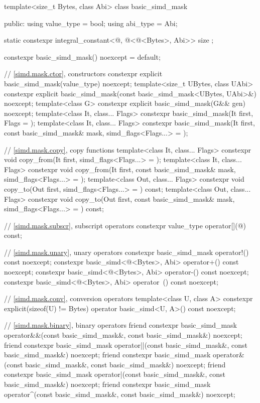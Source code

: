 \begin{codeblock}
template<size_t Bytes, class Abi> class basic_simd_mask {
public:
  using value_type = bool;
  using abi_type = Abi;

  static constexpr integral_constant<@\simdsizetype@, @\simdsizev@<@\integerfrom@<Bytes>, Abi>>
    size {};

  constexpr basic_simd_mask() noexcept = default;

  // \ref{simd.mask.ctor},  constructors
  constexpr explicit basic_simd_mask(value_type) noexcept;
  template<size_t UBytes, class UAbi>
    constexpr explicit basic_simd_mask(const basic_simd_mask<UBytes, UAbi>&) noexcept;
  template<class G> constexpr explicit basic_simd_mask(G&& gen) noexcept;
  template<class It, class... Flags>
    constexpr basic_simd_mask(It first, Flags = {});
  template<class It, class... Flags>
    constexpr basic_simd_mask(It first, const basic_simd_mask& mask, simd_flags<Flags...> = {});

  // \ref{simd.mask.copy},  copy functions
  template<class It, class... Flags>
    constexpr void copy_from(It first, simd_flags<Flags...> = {});
  template<class It, class... Flags>
    constexpr void copy_from(It first, const basic_simd_mask& mask, simd_flags<Flags...> = {});
  template<class Out, class... Flags>
    constexpr void copy_to(Out first, simd_flags<Flags...> = {}) const;
  template<class Out, class... Flags>
    constexpr void copy_to(Out first, const basic_simd_mask& mask,
                           simd_flags<Flags...> = {}) const;

  // \ref{simd.mask.subscr},  subscript operators
  constexpr value_type operator[](@\simdsizetype@) const;

  // \ref{simd.mask.unary},  unary operators
  constexpr basic_simd_mask operator!() const noexcept;
  constexpr basic_simd<@\integerfrom@<Bytes>, Abi> operator+() const noexcept;
  constexpr basic_simd<@\integerfrom@<Bytes>, Abi> operator-() const noexcept;
  constexpr basic_simd<@\integerfrom@<Bytes>, Abi> operator~() const noexcept;

  // \ref{simd.mask.conv},  conversion operators
  template<class U, class A>
    constexpr explicit(sizeof(U) != Bytes) operator basic_simd<U, A>() const noexcept;

  // \ref{simd.mask.binary},  binary operators
  friend constexpr basic_simd_mask
    operator&&(const basic_simd_mask&, const basic_simd_mask&) noexcept;
  friend constexpr basic_simd_mask
    operator||(const basic_simd_mask&, const basic_simd_mask&) noexcept;
  friend constexpr basic_simd_mask
    operator&(const basic_simd_mask&, const basic_simd_mask&) noexcept;
  friend constexpr basic_simd_mask
    operator|(const basic_simd_mask&, const basic_simd_mask&) noexcept;
  friend constexpr basic_simd_mask
    operator^(const basic_simd_mask&, const basic_simd_mask&) noexcept;

}
\end{codeblock}
